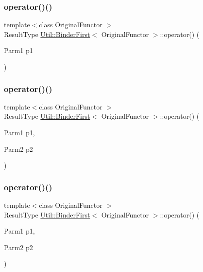 \subsubsection{\texorpdfstring{operator()()}{operator()()}\hspace{0.1cm}{\footnotesize\ttfamily [6/15]}}
{\footnotesize\ttfamily template$<$class Original\+Functor $>$ \\
Result\+Type \mbox{\hyperlink{classUtil_1_1BinderFirst}{Util\+::\+Binder\+First}}$<$ Original\+Functor $>$\+::operator() (\begin{DoxyParamCaption}\item[{Parm1}]{p1 }\end{DoxyParamCaption})\hspace{0.3cm}{\ttfamily [inline]}}

\mbox{\label{classUtil_1_1BinderFirst_a7abd5ef4f28a0496beb24d4295e1d181}} 
\subsubsection{\texorpdfstring{operator()()}{operator()()}\hspace{0.1cm}{\footnotesize\ttfamily [7/15]}}
{\footnotesize\ttfamily template$<$class Original\+Functor $>$ \\
Result\+Type \mbox{\hyperlink{classUtil_1_1BinderFirst}{Util\+::\+Binder\+First}}$<$ Original\+Functor $>$\+::operator() (\begin{DoxyParamCaption}\item[{Parm1}]{p1,  }\item[{Parm2}]{p2 }\end{DoxyParamCaption})\hspace{0.3cm}{\ttfamily [inline]}}

\mbox{\label{classUtil_1_1BinderFirst_a7abd5ef4f28a0496beb24d4295e1d181}} 
\subsubsection{\texorpdfstring{operator()()}{operator()()}\hspace{0.1cm}{\footnotesize\ttfamily [8/15]}}
{\footnotesize\ttfamily template$<$class Original\+Functor $>$ \\
Result\+Type \mbox{\hyperlink{classUtil_1_1BinderFirst}{Util\+::\+Binder\+First}}$<$ Original\+Functor $>$\+::operator() (\begin{DoxyParamCaption}\item[{Parm1}]{p1,  }\item[{Parm2}]{p2 }\end{DoxyParamCaption})\hspace{0.3cm}{\ttfamily [inline]}}

